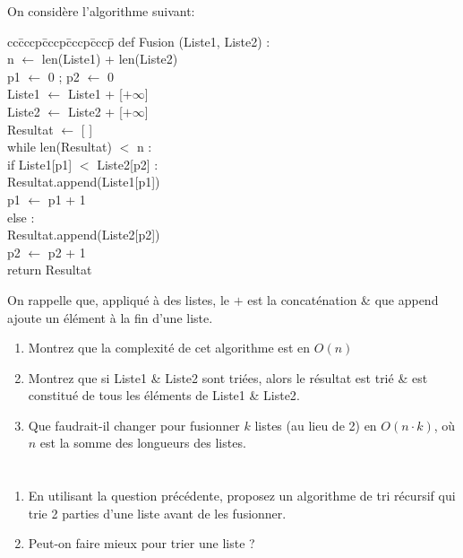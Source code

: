 \documentclass
[12pt]
{article}
\begin{document}
On considère l'algorithme suivant:
{\footnotesize{
\begin{tabbing}
cc\=cccp\=cccp\=cccp\=cccp\=\kill
\>\textsf{def Fusion (Liste1, Liste2) :} \\
\>\>\textsf{n $\gets$ len(Liste1) + len(Liste2) } \\
\>\>\textsf{p1 $\gets$ 0 ; p2 $\gets$ 0 } \\
\>\>\textsf{Liste1 $\gets$ Liste1 + [$+\infty$]   } \\
\>\>\textsf{Liste2 $\gets$ Liste2 + [$+\infty$]  } \\
\>\>\textsf{Resultat $\gets$  [ ]  } \\
\>\>\textsf{while len(Resultat) $<$ n :  } \\
\>\>\>\textsf{if Liste1[p1] $<$ Liste2[p2] :} \\
\>\>\>\>\textsf{Resultat.append(Liste1[p1])} \\
\>\>\>\>\textsf{p1 $\gets$ p1 + 1} \\
\>\>\>\textsf{else :} \\
\>\>\>\>\textsf{Resultat.append(Liste2[p2])} \\
\>\>\>\>\textsf{p2 $\gets$ p2 + 1} \\
\>\>\textsf{return Resultat } 
\end{tabbing}
}}
%
On rappelle que, appliqué à des listes, le $+$ est la concaténation \& que {\sf append} ajoute un élément à la fin d'une liste. 
%
\begin{enumerate}
    \item Montrez que la complexité de cet algorithme est en $O(n)$
    \item  Montrez que si {\sf Liste1} \& {\sf Liste2} sont triées, alors le résultat est trié \& est constitué de tous les éléments de {\sf Liste1} \& {\sf Liste2}.
    \item  Que faudrait-il changer pour fusionner $k$ listes (au lieu de 2) en $O(n\cdot k)$, où $n$ est la somme des longueurs des listes.
\end{enumerate}


\section{}

\begin{enumerate}
    \item En utilisant la question précédente, proposez un algorithme de tri récursif qui trie 2 parties d'une liste avant de les fusionner.
    \item Peut-on faire mieux pour trier une liste ?
\end{enumerate}
\end{document}
